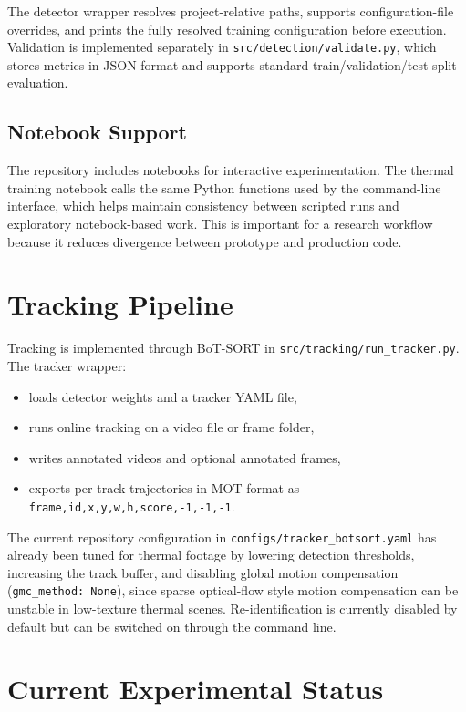 \documentclass[10pt,conference]{IEEEtran}
\begin{document}
The detector wrapper resolves project-relative paths, supports configuration-file overrides, and prints the fully resolved training configuration before execution. Validation is implemented separately in \texttt{src/detection/validate.py}, which stores metrics in JSON format and supports standard train/validation/test split evaluation.

\subsection{Notebook Support}
The repository includes notebooks for interactive experimentation. The thermal training notebook calls the same Python functions used by the command-line interface, which helps maintain consistency between scripted runs and exploratory notebook-based work. This is important for a research workflow because it reduces divergence between prototype and production code.

\section{Tracking Pipeline}
Tracking is implemented through BoT-SORT in \texttt{src/tracking/run\_tracker.py}. The tracker wrapper:

\begin{itemize}[leftmargin=1.5em]
    \item loads detector weights and a tracker YAML file,
    \item runs online tracking on a video file or frame folder,
    \item writes annotated videos and optional annotated frames,
    \item exports per-track trajectories in MOT format as \texttt{frame,id,x,y,w,h,score,-1,-1,-1}.
\end{itemize}

The current repository configuration in \texttt{configs/tracker\_botsort.yaml} has already been tuned for thermal footage by lowering detection thresholds, increasing the track buffer, and disabling global motion compensation (\texttt{gmc\_method: None}), since sparse optical-flow style motion compensation can be unstable in low-texture thermal scenes. Re-identification is currently disabled by default but can be switched on through the command line.

\section{Current Experimental Status}
\end{document}

